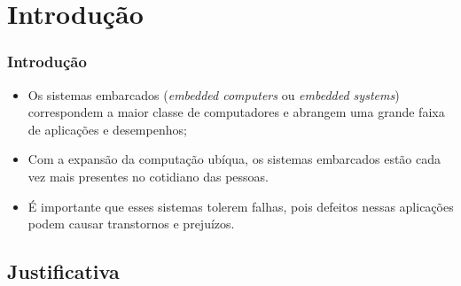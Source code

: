 
\section{Introdução} \label{Sec:Introducao}

\begin{frame}
	\frametitle{Introdução}
	\begin{itemize}
		\item Os sistemas embarcados (\textit{embedded computers} ou \textit{embedded systems}) correspondem a maior classe de computadores e abrangem uma grande faixa de aplicações e desempenhos;
		\item Com a expansão da computação ubíqua, os sistemas embarcados estão cada vez mais presentes no cotidiano das pessoas.
		\item É importante que esses sistemas tolerem falhas, pois defeitos nessas aplicações podem causar transtornos e prejuízos.		
		\end{itemize}
\end{frame}

\subsection{Justificativa}

